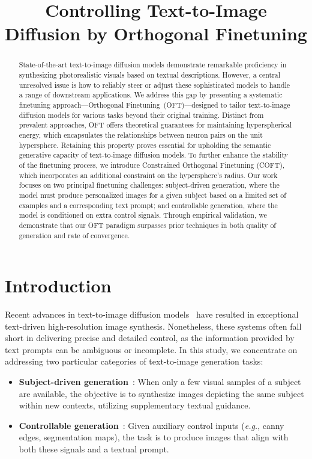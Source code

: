 \title{Controlling Text-to-Image Diffusion by Orthogonal Finetuning}

\begin{abstract}
State-of-the-art text-to-image diffusion models demonstrate remarkable proficiency in synthesizing photorealistic visuals based on textual descriptions. However, a central unresolved issue is how to reliably steer or adjust these sophisticated models to handle a range of downstream applications. We address this gap by presenting a systematic finetuning approach—Orthogonal Finetuning~(OFT)—designed to tailor text-to-image diffusion models for various tasks beyond their original training. Distinct from prevalent approaches, OFT offers theoretical guarantees for maintaining hyperspherical energy, which encapsulates the relationships between neuron pairs on the unit hypersphere. Retaining this property proves essential for upholding the semantic generative capacity of text-to-image diffusion models. To further enhance the stability of the finetuning process, we introduce Constrained Orthogonal Finetuning (COFT), which incorporates an additional constraint on the hypersphere's radius. Our work focuses on two principal finetuning challenges: subject-driven generation, where the model must produce personalized images for a given subject based on a limited set of examples and a corresponding text prompt; and controllable generation, where the model is conditioned on extra control signals. Through empirical validation, we demonstrate that our OFT paradigm surpasses prior techniques in both quality of generation and rate of convergence.
\end{abstract}

\section{Introduction}

Recent advances in text-to-image diffusion models~\cite{saharia2022photorealistic,ramesh2022hierarchical,rombach2022high} have resulted in exceptional text-driven high-resolution image synthesis. Nonetheless, these systems often fall short in delivering precise and detailed control, as the information provided by text prompts can be ambiguous or incomplete. In this study, we concentrate on addressing two particular categories of text-to-image generation tasks:

\begin{itemize}[leftmargin=*,nosep]

    \item \textbf{Subject-driven generation}~\cite{ruiz2023dreambooth}: When only a few visual samples of a subject are available, the objective is to synthesize images depicting the same subject within new contexts, utilizing supplementary textual guidance.
    \item \textbf{Controllable generation}~\cite{zhang2023adding,mou2023t2i}: Given auxiliary control inputs (\emph{e.g.}, canny edges, segmentation maps), the task is to produce images that align with both these signals and a textual prompt.
\end{itemize}

